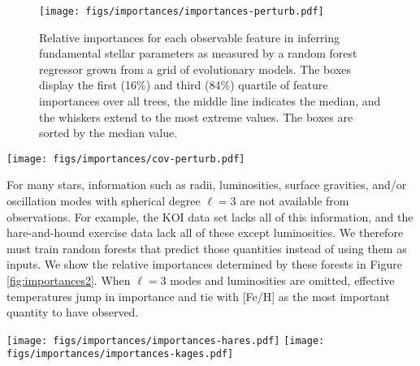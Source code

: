 \documentclass[twocolumn,twocolappendix]{aastex6}
\newcommand{\colwidth}{\linewidth}
\begin{document}
\begin{figure}
    \centering
    \texttt{[image: figs/importances/importances-perturb.pdf]}
    \caption{Relative importances for each observable feature in inferring fundamental stellar parameters as measured by a random forest regressor grown from a grid of evolutionary models. The boxes display the first (16\%) and third (84\%) quartile of feature importances over all trees, the middle line indicates the median, and the whiskers extend to the most extreme values. The boxes are sorted by the median value.}
    \label{fig:importances}
\end{figure}

\begin{figure*}
    \centering
    \texttt{[image: figs/importances/cov-perturb.pdf]}
    \caption{Standardized covariances of random forest feature importances with variables shown in order of median importance. Larger values of the covariance indicates that the parameters are often used together, whereas smaller values indicate redundancy. } 
    \label{fig:importance-covariances}
\end{figure*}

For many stars, information such as radii, luminosities, surface gravities, and/or oscillation modes with spherical degree $\ell=3$ are not available from observations. For example, the KOI data set lacks all of this information, and the hare-and-hound exercise data lack all of these except luminosities. We therefore must train random forests that predict those quantities instead of using them as inputs. We show the relative importances determined by these forests in Figure \ref{fig:importances2}. When $\ell=3$ modes and luminosities are omitted, effective temperatures jump in importance and tie with [Fe/H] as the most important quantity to have observed. 

\begin{figure*}
    \centering
    \texttt{[image: figs/importances/importances-hares.pdf]}\hfill
    \texttt{[image: figs/importances/importances-kages.pdf]}
    \caption{Box-and-whisker plots of relative importances for each observable feature in measuring fundamental stellar parameters for the hare-and-hound exercise data (left), where luminosities are available; and the Kepler objects-of-interest (right), where they are not. Octupole ($\ell=3$) modes have not been measured in any of these stars, so $\langle\delta\nu_{1,3}\rangle$ and $\langle r_{1,3}\rangle$ from evolutionary modelling are not supplied to these random forests. \label{fig:importances2} }
\end{figure*}
\end{document}
